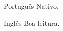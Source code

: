 

\begin{cvskills}

  \cvskill
    {Português} %
    {Nativo.} %

  \cvskill
    {Inglês} %
    {Boa leitura.} %


\end{cvskills}




